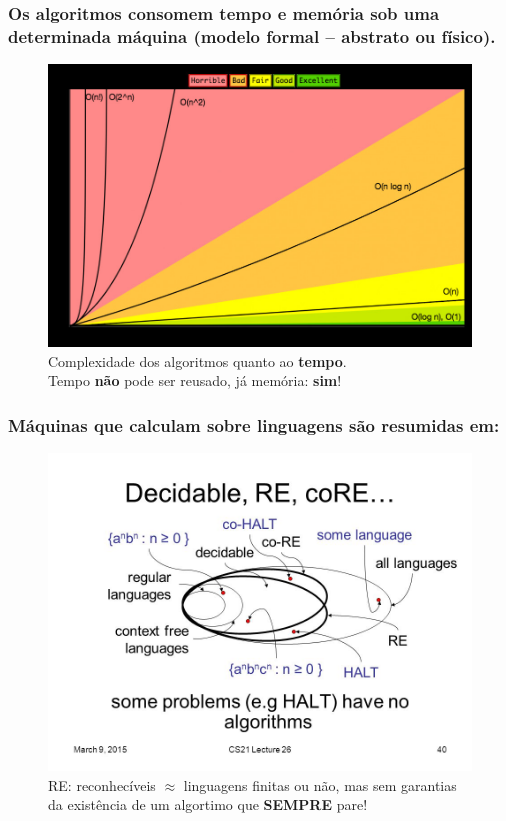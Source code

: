 \documentclass[10pt]{beamer}
\begin{document}


\begin{frame}[fragile]

\frametitle{\normalsize{Os algoritmos  consomem \textbf{tempo} e \textbf{memória} sob uma determinada máquina (modelo formal -- abstrato ou físico). }}

\begin{figure}[!ht]
	\centering
	\includegraphics[height =.64\textheight,width=.8\textwidth]
	{figuras/complexidade_algo.jpg}
	\caption{Complexidade dos algoritmos quanto ao \textbf{tempo}.\\Tempo \textbf{não} pode ser reusado, já memória: \textbf{sim}!}
\end{figure}

\end{frame}


\begin{frame}[fragile]

\frametitle{Máquinas que calculam sobre linguagens são resumidas em:}

\begin{figure}[!ht]
\centering
\includegraphics[height =.65\textheight,width=.85\textwidth]
{figuras/some+problems+have+no+algorithms_HALT.jpg}
\caption{RE: reconhecíveis $\approx $ linguagens finitas ou não, mas sem garantias da existência de um algortimo que \textbf{SEMPRE} pare!}
\end{figure}

\end{frame}
\end{document}
